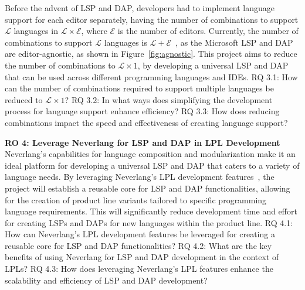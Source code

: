 \hfill \break
Before the advent of LSP and DAP, developers had to implement language support for each editor separately, having the number of combinations to support $\mathcal{L}$ languages in $\mathcal{L} \times \mathcal{E}$, where $\mathcal{E}$ is the number of editors.
Currently, the number of combinations to support $\mathcal{L}$ languages is $\mathcal{L} + \mathcal{E}$~\cite{Rodriguez-Echeverria18a}, as the Microsoft LSP and DAP are editor-agnostic, as shown in Figure~\ref{fig:agnostic}. This project aims to reduce the number of combinations to $\mathcal{L} \times 1$, by developing a universal LSP and DAP that can be used across different programming languages and IDEs.
\hfill \break
\textsf{\hypertarget{rq31}{RQ 3.1}}: How can the number of combinations required to support multiple languages be reduced to $\mathcal{L} \times 1$?
\hfill \break
\textsf{\hypertarget{rq32}{RQ 3.2}}: In what ways does simplifying the development process for language support enhance efficiency?
\hfill \break
\textsf{\hypertarget{rq33}{RQ 3.3}}: How does reducing combinations impact the speed and effectiveness of creating language support?

\hfill \break
\noindent
\textbf{\hypertarget{ro4}{RO 4}: Leverage Neverlang for LSP and DAP in LPL Development}
\hfill \break
Neverlang's capabilities for language composition and modularization make it an ideal platform for developing a universal LSP and DAP that caters to a variety of language needs. By leveraging Neverlang's LPL development features~\cite{Cazzola20}, the project will establish a reusable core for LSP and DAP functionalities, allowing for the creation of product line variants tailored to specific programming language requirements. This will significantly reduce development time and effort for creating LSPs and DAPs for new languages within the product line.
\hfill \break
\textsf{\hypertarget{rq41}{RQ 4.1}}: How can Neverlang's LPL development features be leveraged for creating a reusable core for LSP and DAP functionalities?
\hfill \break
\textsf{\hypertarget{rq42}{RQ 4.2}}: What are the key benefits of using Neverlang for LSP and DAP development in the context of LPLs?
\hfill \break
\textsf{\hypertarget{rq43}{RQ 4.3}}: How does leveraging Neverlang's LPL features enhance the scalability and efficiency of LSP and DAP development?
